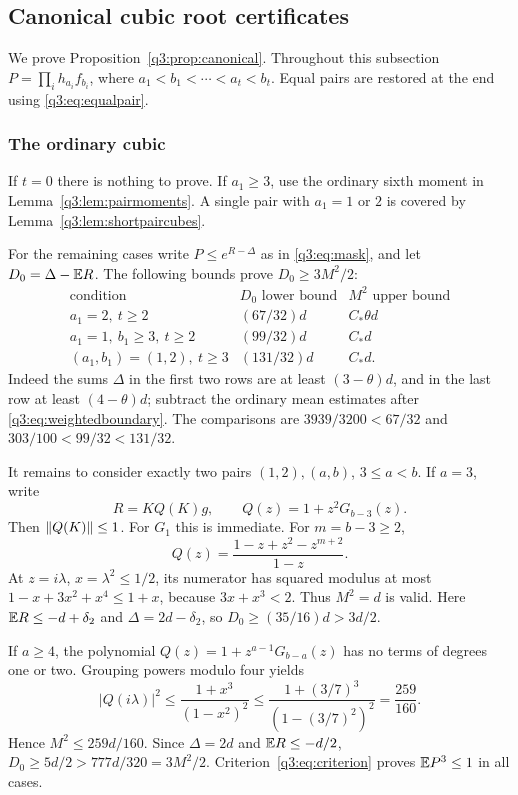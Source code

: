 \subsection{Canonical cubic root certificates}\label{q3:app:canonical}
We prove Proposition~\ref{q3:prop:canonical}. Throughout this subsection $P=\prod_{i} h_{a_i}f_{b_i}$, where $a_1<b_1<\cdots<a_t<b_t$. Equal pairs are restored at the end using \eqref{q3:eq:equalpair}.

\subsubsection{The ordinary cubic}
If $t=0$ there is nothing to prove. If $a_1\ge3$, use the ordinary sixth moment in Lemma~\ref{q3:lem:pairmoments}. A single pair with $a_1=1$ or $2$ is covered by Lemma~\ref{q3:lem:shortpaircubes}.

For the remaining cases write $P\le e^{R-\Delta}$ as in \eqref{q3:eq:mask}, and let $D_0=\Delta-\mathbb E R$. The following bounds prove $D_0\ge3M^2/2$:
\[
\begin{array}{c|c|c}
\text{condition}&D_0\text{ lower bound}&M^2\text{ upper bound}\\ \hline
a_1=2,\ t\ge2 &(67/32)d&C_*\theta d\\
a_1=1,\ b_1\ge3,\ t\ge2 &(99/32)d&C_*d\\
(a_1,b_1)=(1,2),\ t\ge3 &(131/32)d&C_*d .
\end{array}
\]
Indeed the sums $\Delta$ in the first two rows are at least $(3-\theta)d$, and in the last row at least $(4-\theta)d$; subtract the ordinary mean estimates after \eqref{q3:eq:weightedboundary}. The comparisons are $3939/3200<67/32$ and $303/100<99/32<131/32$.

It remains to consider exactly two pairs $(1,2),(a,b)$, $3\le a<b$. If $a=3$, write
\[
 R=KQ(K)g,\qquad Q(z)=1+z^2G_{b-3}(z).
\]
Then $\left\lVert Q(K)\right\rVert\le1$. For $G_1$ this is immediate. For $m=b-3\ge2$,
\[
 Q(z)=\frac{1-z+z^2-z^{m+2}}{1-z}.
\]
At $z=i\lambda$, $x=\lambda^2\le1/2$, its numerator has squared modulus at most $1-x+3x^2+x^4\le1+x$, because $3x+x^3<2$. Thus $M^2=d$ is valid. Here $\mathbb E R\le-d+\delta_{2}$ and $\Delta=2d-\delta_{2}$, so $D_0\ge(35/16)d>3d/2$.

If $a\ge4$, the polynomial $Q(z)=1+z^{a-1}G_{b-a}(z)$ has no terms of degrees one or two. Grouping powers modulo four yields
\[
 |Q(i\lambda)|^2\le\frac{1+x^3}{(1-x^2)^2}
 \le\frac{1+(3/7)^3}{(1-(3/7)^2)^2}=\frac{259}{160}.
\]
Hence $M^2\le259d/160$. Since $\Delta=2d$ and $\mathbb E R\le-d/2$, $D_0\ge5d/2>777d/320=3M^2/2$. Criterion~\eqref{q3:eq:criterion} proves $\mathbb E P^3\le1$ in all cases.


